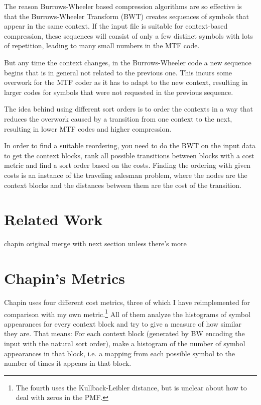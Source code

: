 \documentclass[a4paper]{scrreprt}
\begin{document}
The reason Burrows-Wheeler based compression algorithms are so effective is that
the Burrows-Wheeler Transform (BWT) creates sequences of symbols that appear in
the same context. If the input file is suitable for context-based
compression, these sequences will consist of only a few distinct symbols with
lots of repetition, leading to many small numbers in the MTF code.


But any time the context changes, in the Burrows-Wheeler code a new sequence
begins that is in general not related to the previous one. This incurs some
overwork\cite{bitner1979heuristics} for the MTF coder as it has to adapt to the
new context, resulting in larger codes for symbols that were not requested in
the previous sequence.


The idea behind using different sort orders is to order the contexts in a way
that reduces the overwork caused by a transition from one context to the next,
resulting in lower MTF codes and higher compression.

In order to find a suitable reordering, you need to do the BWT on the input data
to get the context blocks, rank all possible transitions between blocks with a
cost metric and find a sort order based on the costs. Finding the ordering with
given costs is an instance of the traveling salesman problem, where the nodes
are the context blocks and the distances between them are the cost of the
transition.

\section{Related Work}

chapin original \cite{chapin1998sort,chapin2001diss}
merge with next section unless there's more

\section{Chapin's Metrics}


Chapin uses four different cost metrics, three of which I have reimplemented for
comparison with my own metric.\footnote{The fourth uses the Kullback-Leibler
distance, but is unclear about how to deal with zeros in the PMF.} All of them
analyze the histograms of symbol appearances for every context block and try to
give a measure of how similar they are. That means: For each context block
(generated by BW encoding the input with the natural sort order), make a
histogram of the number of symbol appearances in that block, i.e.
a mapping from each possible symbol to the number of times it appears in that
block.
\end{document}
